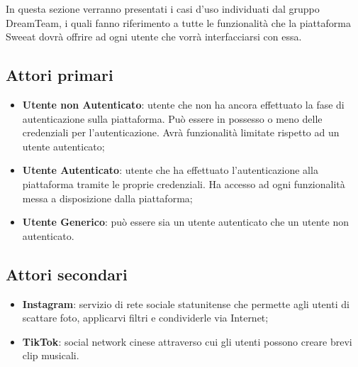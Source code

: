 In questa sezione verranno presentati i casi d’uso individuati dal gruppo DreamTeam, i quali fanno riferimento a tutte le funzionalità che la piattaforma Sweeat dovrà offrire ad ogni utente che vorrà interfacciarsi con essa.
\subsection{Attori primari}
\begin{itemize}
    \item \textbf{Utente non Autenticato}: utente che non ha ancora effettuato la fase di autenticazione sulla piattaforma. Può essere in possesso o meno delle credenziali per l’autenticazione. Avrà funzionalità limitate rispetto ad un utente autenticato;
    \item \textbf{Utente Autenticato}: utente che ha effettuato l’autenticazione alla piattaforma tramite le proprie credenziali. Ha accesso ad ogni funzionalità messa a disposizione dalla piattaforma;
    \item \textbf{Utente Generico}: può essere sia un utente autenticato che un utente non autenticato.
\end{itemize}
\subsection{Attori secondari}
\begin{itemize}
    \item \textbf{Instagram}: servizio di rete sociale statunitense che permette agli utenti di scattare foto, applicarvi filtri e condividerle via Internet;
    \item \textbf{TikTok}: social network cinese attraverso cui gli utenti possono creare brevi clip musicali.
\end{itemize}
\clearpage 